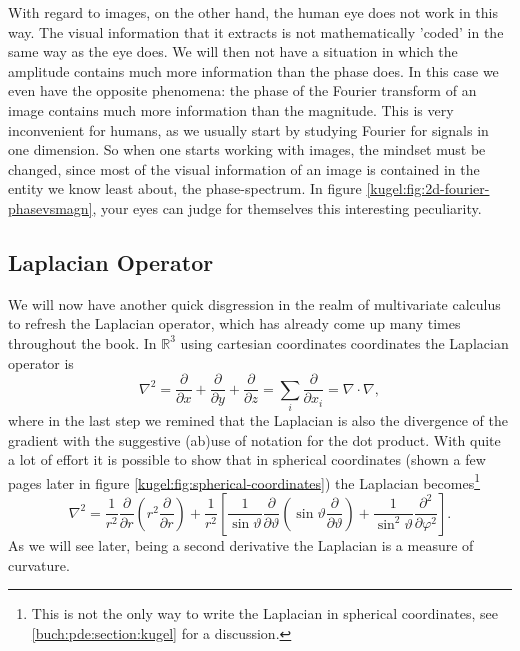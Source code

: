 With regard to images, on the other hand, the human eye does not work in this
way. The visual information that it extracts is not mathematically 'coded' in 
the same way as the eye does. We will then not have a situation in which the 
amplitude contains much more information than the phase does. In this case
we even have the opposite phenomena:
the phase of the Fourier transform of an image contains much more information
than the magnitude. This is very inconvenient for humans, as we usually start
by studying Fourier for signals in one dimension. So when one starts working
with images, the mindset must be changed, since most of the visual information
of an image is contained in the entity we know least about, the
phase-spectrum. In figure \ref{kugel:fig:2d-fourier-phasevsmagn}, your eyes
can judge for themselves this interesting peculiarity.

\subsection{Laplacian Operator}
\label{kugel:sec:preliminaries:laplacian}

We will now have another quick disgression in the realm of multivariate
calculus to refresh the Laplacian operator, which has already come up many
times throughout the book. In $\mathbb{R}^3$ using cartesian coordinates
coordinates the Laplacian operator is
\begin{equation*}
  \nabla^2 = \frac{\partial}{\partial x}
    + \frac{\partial}{\partial y}
    + \frac{\partial}{\partial z}
    = \sum_i \frac{\partial}{\partial x_i}
    = \nabla \cdot \nabla,
\end{equation*}
where in the last step we remined that the Laplacian is also the divergence of
the gradient with the suggestive (ab)use of notation for the dot product. With
quite a lot of effort it is possible to show that in spherical coordinates
(shown a few pages later in figure \ref{kugel:fig:spherical-coordinates}) the
Laplacian becomes\footnote{This is not the only way to write the Laplacian in
spherical coordinates, see \ref{buch:pde:section:kugel} for a discussion.}
\begin{equation*}
    \nabla^2 =
      \frac{1}{r^2} \frac{\partial}{\partial r} \left(
        r^2 \frac{\partial}{\partial r}
      \right)
      + \frac{1}{r^2} \left[
          \frac{1}{\sin\vartheta} \frac{\partial}{\partial \vartheta} \left(
            \sin\vartheta \frac{\partial}{\partial\vartheta}
          \right)
        + \frac{1}{\sin^2 \vartheta} \frac{\partial^2}{\partial\varphi^2}
      \right].
\end{equation*}
As we will see later, being a second derivative the Laplacian is a measure of
curvature.

